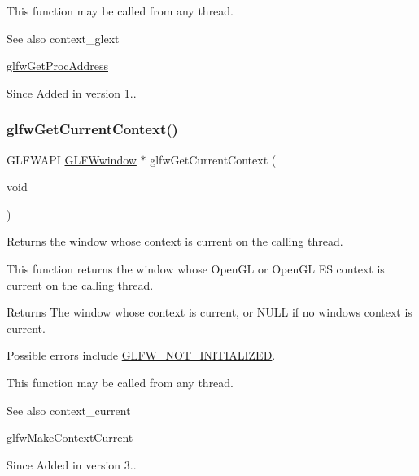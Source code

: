 This function may be called from any thread.

\begin{DoxySeeAlso}{See also}
context\+\_\+glext 

\hyperlink{group__context_ga0e8af175218929615c16e74938c10f2a}{glfw\+Get\+Proc\+Address}
\end{DoxySeeAlso}
\begin{DoxySince}{Since}
Added in version 1.. 
\end{DoxySince}
\mbox{\label{group__context_gab5fde1ef6238bfb82c7a2293f86172de}} 
\subsubsection{\texorpdfstring{glfw\+Get\+Current\+Context()}{glfwGetCurrentContext()}}
{\footnotesize\ttfamily G\+L\+F\+W\+A\+PI \hyperlink{group__window_ga3c96d80d363e67d13a41b5d1821f3242}{G\+L\+F\+Wwindow} $\ast$ glfw\+Get\+Current\+Context (\begin{DoxyParamCaption}\item[{void}]{ }\end{DoxyParamCaption})}



Returns the window whose context is current on the calling thread. 

This function returns the window whose Open\+GL or Open\+GL ES context is current on the calling thread.

\begin{DoxyReturn}{Returns}
The window whose context is current, or {\ttfamily N\+U\+LL} if no window\textquotesingle{}s context is current.
\end{DoxyReturn}
Possible errors include \hyperlink{group__errors_ga2374ee02c177f12e1fa76ff3ed15e14a}{G\+L\+F\+W\+\_\+\+N\+O\+T\+\_\+\+I\+N\+I\+T\+I\+A\+L\+I\+Z\+ED}.

This function may be called from any thread.

\begin{DoxySeeAlso}{See also}
context\+\_\+current 

\hyperlink{group__context_gafd76c93e15ec8b0b90506a9936a46185}{glfw\+Make\+Context\+Current}
\end{DoxySeeAlso}
\begin{DoxySince}{Since}
Added in version 3.. 
\end{DoxySince}
\mbox{\label{group__context_ga0e8af175218929615c16e74938c10f2a}} 
